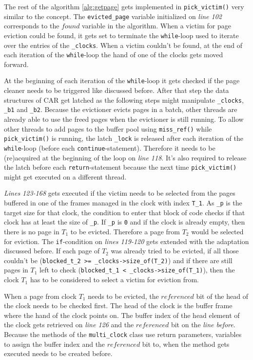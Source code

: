     The rest of the algorithm \ref{alg:getpage} gets implemented in \lstinline{pick_victim()} very similar to the concept. The \lstinline{evicted_page} variable initialized on \emph{line 102} corresponds to the $found$ variable in the algorithm. When a victim for page eviction could be found, it gets set to terminate the \lstinline{while}-loop used to iterate over the entries of the \lstinline{_clocks}. When a  victim couldn't be found, at the end of each iteration of the \lstinline{while}-loop the hand of one of the clocks gets moved forward.

    At the beginning of each iteration of the \lstinline{while}-loop it gets checked if the page cleaner needs to be triggered like discussed before. After that step the data structures of CAR get latched as the following steps might manipulate \lstinline{_clocks}, \lstinline{_b1} and \lstinline{_b2}. Because the evictioner evicts pages in a batch, other threads are already able to use the freed pages when the evictioner is still running. To allow other threads to add pages to the buffer pool using \lstinline{miss_ref()} while \lstinline{pick_victim()} is running, the latch \lstinline{_lock} is released after each iteration of the \lstinline{while}-loop (before each \lstinline{continue}-statement). Therefore it needs to be (re)acquired at the beginning of the loop on \emph{line 118}. It's also required to release the latch before each \lstinline{return}-statement because the next time \lstinline{pick_victim()} might get executed on a different thread.

    \emph{Lines 123-168} gets executed if the victim needs to be selected from the pages buffered in one of the frames managed in the clock with index \lstinline{T_1}. As \lstinline{_p} is the target size for that clock, the condition to enter that block of code checks if that clock has at least the size of \lstinline{_p}. If \lstinline{_p} is \lstinline{0} and if the clock is already empty, then there is no page in $T_1$ to be evicted. Therefore a page from $T_2$ would be selected for eviction. The \lstinline{if}-condition on \emph{lines 119-120} gets extended with the adaptation discussed before. If each page of $T_2$ was already tried to be evicted, if all those couldn't be (\lstinline{blocked_t_2 >= _clocks->size_of(T_2)}) and if there are still pages in $T_1$ left to check (\lstinline{blocked_t_1 < _clocks->size_of(T_1)}), then the clock $T_1$ has to be considered to select a victim for eviction from.

    When a page from clock $T_1$ needs to be evicted, the $referenced$ bit of the head of the clock needs to be checked first. The head of the clock is the buffer frame where the hand of the clock points on. The buffer index of the head element of the clock gets retrieved on \emph{line 126} and the $referenced$ bit on the \emph{line before}. Because the methods of the \lstinline{multi_clock} class use return parameters, variables to assign the buffer index and the $referenced$ bit to, when the method gets executed needs to be created before. 

